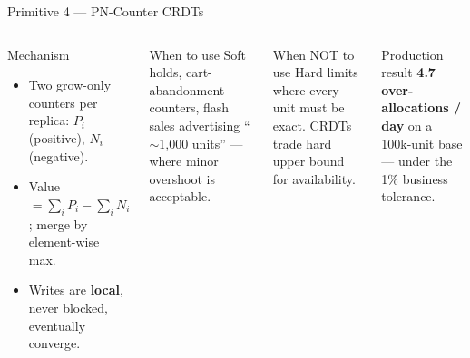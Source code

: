 \documentclass[aspectratio=169,xcolor=dvipsnames,9pt]{beamer}
\begin{document}
\begin{frame}{Primitive 4 --- PN-Counter CRDTs}
\begin{columns}[T]
  \begin{block}{Mechanism}
    \footnotesize
    \begin{itemize}
      \item Two grow-only counters per replica: $P_i$ (positive), $N_i$ (negative).
      \item Value $= \sum_i P_i - \sum_i N_i$; merge by element-wise max.
      \item Writes are \textbf{local}, never blocked, eventually converge.
    \end{itemize}
  \end{block}
  \begin{exampleblock}{When to use}
    \footnotesize
    Soft holds, cart-abandonment counters, flash sales advertising ``$\sim$1{,}000 units'' --- where minor overshoot is acceptable.
  \end{exampleblock}

  \begin{alertblock}{When NOT to use}
    \footnotesize
    Hard limits where every unit must be exact. CRDTs trade hard upper bound for availability.
  \end{alertblock}
  \begin{block}{Production result}
    \footnotesize
    \textbf{4.7 over-allocations / day} on a 100k-unit base --- under the 1\% business tolerance.
  \end{block}
\end{columns}
\end{frame}
\end{document}
